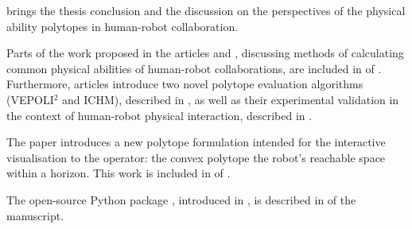 
 brings the thesis conclusion and the discussion on the perspectives of the physical ability polytopes in human-robot collaboration.


{

\newrefcontext[labelprefix=A]
\printbibliography[keyword={phd}, title=List of publications, heading=subbibnumbered, prenote=pubthesis]

Parts of the work proposed in the articles \cite{skuric2021robot} and  \cite{skuric2021common}, discussing methods of calculating common physical abilities of human-robot collaborations, are included in  of . Furthermore, articles \cite{skuric2021robot,Skuric2022human,skuric2023dynamics} introduce two novel polytope evaluation algorithms (VEPOLI$^2$ and ICHM), described in , as well as their experimental validation in the context of human-robot physical interaction, described in . 


The paper \cite{Skuric2022hfr} introduces a new polytope formulation intended for the interactive visualisation to the operator: the convex polytope the robot's reachable space within a horizon. This work is included in  of .


The open-source Python package , introduced in \cite{pycapacity}, is described in  of the manuscript.



}
{
\nocite{Zhen2020RWM, Skuric2022simplefoc}
\newrefcontext[labelprefix=B]
\printbibliography[keyword={phd_out}, title=Other publications during the thesis, heading=subbibliography, prenote=nopubthesis]



}

